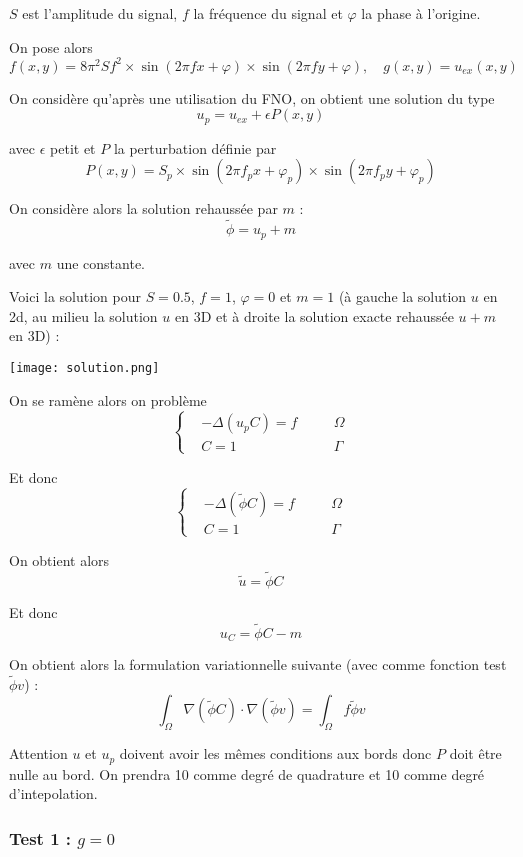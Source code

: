 $S$ est l'amplitude du signal, $f$ la fréquence du signal et $\varphi$ la phase à l'origine.

On pose alors
$$f(x,y)=8\pi^2 Sf^2\times\sin(2\pi fx + \varphi)\times\sin(2\pi fy + \varphi), \quad g(x,y)=u_{ex}(x,y)$$

On considère qu'après une utilisation du FNO, on obtient une solution du type
$$u_p = u_{ex}+\epsilon P(x,y)$$

avec $\epsilon$ petit et $P$ la perturbation définie par
$$P(x,y)=S_p\times\sin(2\pi f_px + \varphi_p)\times\sin(2\pi f_py + \varphi_p)$$

On considère alors la solution rehaussée par $m$ :
$$\tilde{\phi}=u_p+m$$

avec $m$ une constante.

Voici la solution pour $S=0.5$, $f=1$, $\varphi=0$ et $m=1$ (à gauche la solution $u$ en 2d, au milieu la solution $u$ en 3D et à droite la solution exacte rehaussée $u+m$ en 3D) :

\begin{minipage}{\linewidth}
	\centering
	\texttt{[image: solution.png]}
\end{minipage}

On se ramène alors on problème
$$\left\{\begin{aligned}
	&-\Delta (u_pC)=f \quad &&\Omega \\
	&C=1 \quad &&\Gamma
\end{aligned}\right.$$

Et donc
$$\left\{\begin{aligned}
	&-\Delta(\tilde{\phi}C)=f \quad &&\Omega \\
	&C=1 \quad &&\Gamma
\end{aligned}\right.$$

On obtient alors
$$\tilde{u}=\tilde{\phi}C$$

Et donc
$$u_C=\tilde{\phi}C-m$$

On obtient alors la formulation variationnelle suivante (avec comme fonction test $\tilde{\phi}v$) :
$$\int_{\Omega}\nabla (\tilde{\phi}C)\cdot\nabla (\tilde{\phi}v)=\int_\Omega f\tilde{\phi}v$$

\begin{Rem}
	Attention $u$ et $u_p$ doivent avoir les mêmes conditions aux bords donc $P$ doit être nulle au bord. On prendra 10 comme degré de quadrature et 10 comme degré d'intepolation.
\end{Rem}

\subsubsection*{Test 1 : $g=0$}

